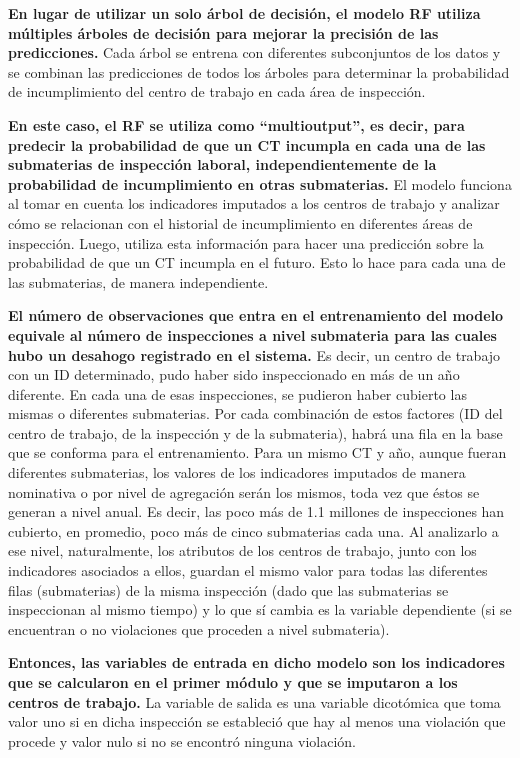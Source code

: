 \documentclass[
]{article}
\begin{document}
\textbf{En lugar de utilizar un solo árbol de decisión, el modelo RF utiliza múltiples árboles de decisión para mejorar la precisión de las predicciones.} Cada árbol se entrena con diferentes subconjuntos de los datos y se combinan las predicciones de todos los árboles para determinar la probabilidad de incumplimiento del centro de trabajo en cada área de inspección.

\textbf{En este caso, el RF se utiliza como ``multioutput'', es decir, para predecir la probabilidad de que un CT incumpla en cada una de las submaterias de inspección laboral, independientemente de la probabilidad de incumplimiento en otras submaterias.} El modelo funciona al tomar en cuenta los indicadores imputados a los centros de trabajo y analizar cómo se relacionan con el historial de incumplimiento en diferentes áreas de inspección. Luego, utiliza esta información para hacer una predicción sobre la probabilidad de que un CT incumpla en el futuro. Esto lo hace para cada una de las submaterias, de manera independiente.

\textbf{El número de observaciones que entra en el entrenamiento del modelo equivale al número de inspecciones a nivel submateria para las cuales hubo un desahogo registrado en el sistema.} Es decir, un centro de trabajo con un ID determinado, pudo haber sido inspeccionado en más de un año diferente. En cada una de esas inspecciones, se pudieron haber cubierto las mismas o diferentes submaterias. Por cada combinación de estos factores (ID del centro de trabajo, de la inspección y de la submateria), habrá una fila en la base que se conforma para el entrenamiento. Para un mismo CT y año, aunque fueran diferentes submaterias, los valores de los indicadores imputados de manera nominativa o por nivel de agregación serán los mismos, toda vez que éstos se generan a nivel anual. Es decir, las poco más de 1.1 millones de inspecciones han cubierto, en promedio, poco más de cinco submaterias cada una. Al analizarlo a ese nivel, naturalmente, los atributos de los centros de trabajo, junto con los indicadores asociados a ellos, guardan el mismo valor para todas las diferentes filas (submaterias) de la misma inspección (dado que las submaterias se inspeccionan al mismo tiempo) y lo que sí cambia es la variable dependiente (si se encuentran o no violaciones que proceden a nivel submateria).

\textbf{Entonces, las variables de entrada en dicho modelo son los indicadores que se calcularon en el primer módulo y que se imputaron a los centros de trabajo.} La variable de salida es una variable dicotómica que toma valor uno si en dicha inspección se estableció que hay al menos una violación que procede y valor nulo si no se encontró ninguna violación.
\end{document}

